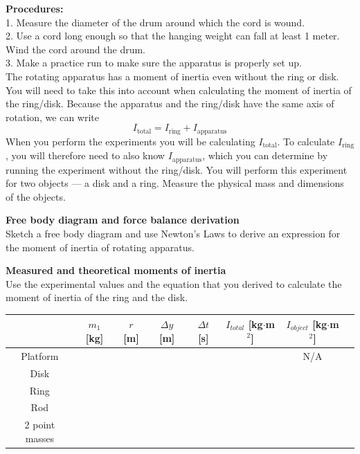 \documentclass[11pt,letterpaper]{article}
\begin{document}
{\bf Procedures:}\\  
1.  Measure the diameter of the drum around which
the cord is wound.\\
2.  Use a cord long enough so that the hanging weight can fall at least
1 meter.  Wind the cord around the drum.\\
3.  Make a practice run to make sure the apparatus is properly
set up.\\

The rotating apparatus has a moment of inertia even without the ring or disk. You will need to take this into account when calculating the moment of inertia of the ring/disk. Because the apparatus and the ring/disk have the same axis of rotation, we can write
$$I_{\mbox{total}}=I_{\mbox{ring}}+I_{\mbox{apparatus}}$$
When you perform the experiments you will be calculating $I_{\mbox{total}}$. To calculate $I_{\mbox{ring}}$, you will therefore need to also know $I_{\mbox{apparatus}}$, which you can determine by running the experiment without the ring/disk. You will perform this experiment for two objects --- a disk and a ring.  Measure the physical mass and dimensions of the objects.\bigskip

{\bf Free body diagram and force balance derivation}\\
Sketch a free body diagram and use Newton's Laws to derive an expression for the moment of inertia of rotating apparatus.

\clearpage
{\bf Measured and theoretical moments of inertia}\\
Use the experimental values and the equation that you derived to calculate
the moment of inertia of the ring and the disk.


\renewcommand{\arraystretch}{1.4}
\begin{table}[h!]
\begin{tabular}{|c|c|c|c|c|c|c|c|}
\hline
& $m_1$ [kg] & $r$ [m] & $\Delta y$ [m] & $\Delta t$ [s] & $I_{total}$ [kg$\cdot$m$^2$] & $I_{object}$ [kg$\cdot$m$^2$]\\
\hline Platform & \hspace{1.5cm} & \hspace{1.5cm} & \hspace{1.5cm} & \hspace{1.5cm} & \hspace{1.5cm} & N/A\\
\hline Disk & & & & & & \\
\hline Ring & & & & & & \\
\hline Rod & & & & & &\\
\hline 2 point masses & & & & & &\\
\hline
\end{tabular}
\end{table}
\end{document}
